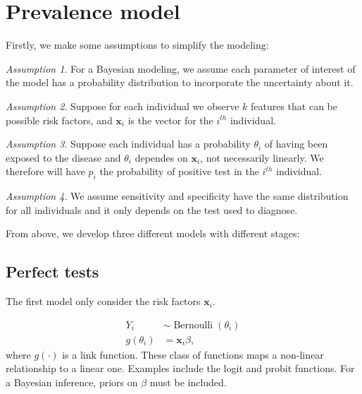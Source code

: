\documentclass[a4paper, notitlepage, 11pt]{article}
\newcommand{\x}{\boldsymbol{x}}
\theoremstyle{definition}
\theoremstyle{remark}
\newtheorem{assumption}{Assumption}
\begin{document}
\section{Prevalence model}

Firstly, we make some assumptions to simplify the modeling:

\begin{assumption}
  For a Bayesian modeling, we assume each parameter of interest of the model
  has a probability distribution to incorporate the uncertainty about it. 
\end{assumption}

\begin{assumption}
  Suppose for each individual we observe $k$ features that can be possible
  risk factors, and $\x_i$ is the vector for the $i^{th}$ individual.
\end{assumption}

\begin{assumption}
  Suppose each individual has a probability $\theta_i$ of having been exposed
  to the disease and $\theta_i$ dependes on $\x_i$, not necessarily linearly.
  We therefore will have $p_i$ the probability of positive test in the
  $i^{th}$ individual.
\end{assumption} 

\begin{assumption}
  We assume sensitivity and specificity have the same distribution for all
  individuals and it only depends on the test used to diagnose. 
\end{assumption}

From above, we develop three different models with different stages: 

\subsection{Perfect tests}

The first model only consider the risk factors $\x_i$. 

\begin{equation}
  \begin{aligned}
    Y_i &\sim \operatorname{Bernoulli}(\theta_i) \\
    g(\theta_i) &= \x_i\beta, 
  \end{aligned}  
\end{equation}
where $g(\cdot)$ is a link function. These class of functions maps a
non-linear relationship to a linear one. Examples include the logit and probit
functions. For a Bayesian inference, priors on $\beta$ must be included. 



 
\end{document}
